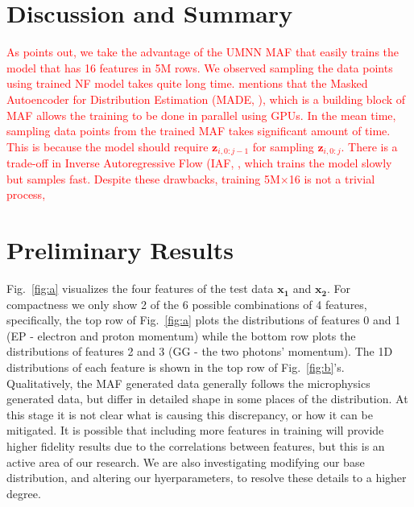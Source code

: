\section{Discussion and Summary}
\textcolor{red}{As \citet{NEURIPS2019_2a084e55} points out, we take the advantage of the UMNN MAF that easily trains the model that has 16 features in 5M rows. We observed sampling the data points using trained NF model takes quite long time. \citet{papamakarios2018masked} mentions that the Masked Autoencoder for Distribution Estimation (MADE, \citet{pmlr-v37-germain15}), which is a building block of MAF allows the training to be done in parallel using GPUs. In the mean time, sampling data points from the trained MAF takes significant amount of time. This is because the model should require $\mathbf{z}_{i,0:j-1}$ for sampling $\mathbf{z}_{i,0:j}$. There is a trade-off in Inverse Autoregressive Flow (IAF, \citet{NIPS2016_ddeebdee}, which trains the model slowly but samples fast. Despite these drawbacks, training 5M$\times$16 is not a trivial process, }


\iffalse
\section{Preliminary Results}
Fig.~\ref{fig:a} visualizes the four features of the test data $\mathbf{x_1}$ and $\mathbf{x_2}$. For compactness we only show 2 of the 6 possible combinations of 4 features, specifically, the top row of  Fig.~\ref{fig:a} plots the distributions of features 0 and 1 (EP - electron and proton momentum) while the bottom row plots the distributions of features 2 and 3 (GG - the two photons' momentum). The 1D distributions of each feature is shown in the top row of Fig.~\ref{fig:b}'s. Qualitatively, the MAF generated data generally follows the microphysics generated data, but differ in detailed shape in some places of the distribution. At this stage it is not clear what is causing this discrepancy, or how it can be mitigated. It is possible that including more features in training will provide higher fidelity results due to the correlations between features, but this is an active area of our research. We are also investigating modifying our base distribution, and altering our hyerparameters, to resolve these details to a higher degree.

